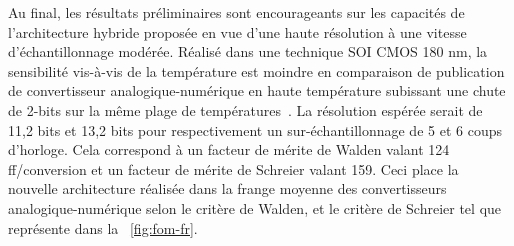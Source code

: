 \begin{mdframed}[linecolor=Prune,linewidth=1]
Au final, les résultats préliminaires sont encourageants sur les capacités de l'architecture hybride proposée en vue d'une haute résolution à une vitesse d'échantillonnage modérée. Réalisé dans une technique SOI CMOS 180 nm, la sensibilité vis-à-vis de la température est moindre en comparaison de publication de convertisseur analogique-numérique en haute température subissant une chute de 2-bits sur la même plage de températures~\cite{Ericson2004}. La résolution espérée serait de 11,2 bits et 13,2 bits pour respectivement un sur-échantillonnage de 5 et 6 coups d'horloge. Cela correspond à un facteur de mérite de Walden valant 124 ff/conversion et un facteur de mérite de Schreier valant 159. Ceci place la nouvelle architecture réalisée dans la frange moyenne des convertisseurs analogique-numérique selon le critère de Walden, et le critère de Schreier tel que représente dans la \figurename~\ref{fig:fom-fr}.


\end{mdframed}
